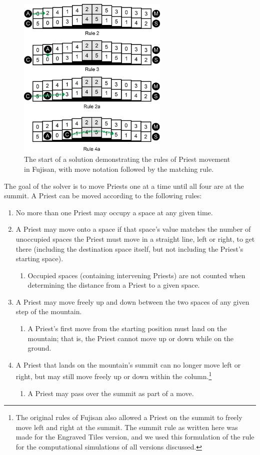 \documentclass[journal]{IEEEtran}
\begin{document}
\begin{figure}[t]
\centering
\includegraphics[width=7.2cm]{figure12.png}
\caption{The start of a solution demonstrating the rules of Priest movement in Fujisan, with move notation followed by the matching rule. }
\label{fig:priestrules}
\end{figure}

The goal of the solver is to move Priests one at a time until all four are at the summit. A Priest can be moved according to the following rules:  

\begin{enumerate}
\item No more than one Priest may occupy a space at any given time.

\item A Priest may move onto a space if that space's value matches the number of unoccupied spaces the Priest must move in a straight line, left or right, to get there (including the destination space itself, but not including the Priest's starting space). %
\begin{enumerate}
\item Occupied spaces (containing intervening Priests) are not counted when determining the distance from a Priest to a given space. %
\end{enumerate}
\item A Priest may move freely up and down between the two spaces of any given step of the mountain. %
\begin{enumerate}
\item A Priest's first move from the starting position must land on the mountain; that is, the Priest cannot move up or down while on the ground.
\end{enumerate}

\item A Priest that lands on the mountain's summit can no longer move left or right, but may still move freely up or down within the column.\footnote{The original rules of Fujisan also allowed a Priest on the summit to freely move left and right at the summit. The summit rule as written here was made for the Engraved Tiles version, and we used this formulation of the rule for the computational simulations of all versions discussed.}
\begin{enumerate}
\item A Priest may pass over the summit as part of a move.
\end{enumerate}
\end{enumerate}
\end{document}
